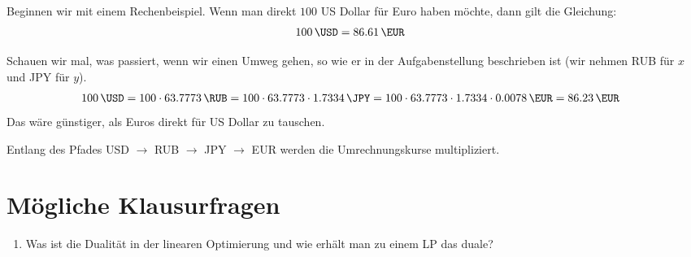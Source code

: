 \documentclass[
a4paper, %
11pt,
]
{scrartcl}
\begin{document}
Beginnen wir mit einem Rechenbeispiel. Wenn man direkt $100$ US Dollar für Euro
haben möchte, dann gilt die Gleichung:
\begin{align*}
  \SI{100}{\USD} & = \SI{86,61}{\EUR}
\end{align*}

Schauen wir mal, was passiert, wenn wir einen Umweg gehen, so wie er in der
Aufgabenstellung beschrieben ist (wir nehmen RUB für $x$ und JPY für $y$).
\begin{align*}
  \SI{100}{\USD} &
    = 100 \cdot \SI{63,7773}{\RUB}
    = 100 \cdot \num{63,7773} \cdot \SI{1,7334}{\JPY}
    = 100 \cdot \num{63,7773} \cdot \num{1,7334} \cdot \SI{0,0078}{\EUR}
    = \SI{86,23}{\EUR}
\end{align*}
Das wäre günstiger, als Euros direkt für US Dollar zu tauschen.

Entlang des Pfades USD $\rightarrow$ RUB $\rightarrow$ JPY $\rightarrow$ EUR
werden die Umrechnungskurse multipliziert.

\section{Mögliche Klausurfragen}%
\label{sec:mogliche_klausurfragen}

\begin{enumerate}
  \item Was ist die Dualität in der linearen Optimierung und wie erhält man zu
    einem LP das duale?
\end{enumerate}
\end{document}
